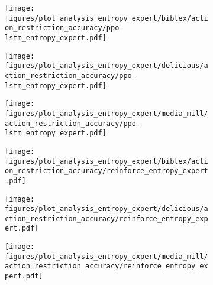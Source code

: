 \begin{figure}[H]
    \begin{subfigure}[b]{0.32\columnwidth}
        \centering
        \texttt{[image: figures/plot\_analysis\_entropy\_expert/bibtex/action\_restriction\_accuracy/ppo-lstm\_entropy\_expert.pdf]}
    \end{subfigure}
    \hfill
    \begin{subfigure}[b]{0.32\columnwidth}
        \centering
        \texttt{[image: figures/plot\_analysis\_entropy\_expert/delicious/action\_restriction\_accuracy/ppo-lstm\_entropy\_expert.pdf]}
    \end{subfigure}
    \hfill
    \begin{subfigure}[b]{0.32\columnwidth}
        \centering
        \texttt{[image: figures/plot\_analysis\_entropy\_expert/media\_mill/action\_restriction\_accuracy/ppo-lstm\_entropy\_expert.pdf]}
    \end{subfigure}
    \hfill

    \begin{subfigure}[b]{0.32\columnwidth}
        \centering
        \texttt{[image: figures/plot\_analysis\_entropy\_expert/bibtex/action\_restriction\_accuracy/reinforce\_entropy\_expert.pdf]}
    \end{subfigure}
    \hfill
    \begin{subfigure}[b]{0.32\columnwidth}
        \centering
        \texttt{[image: figures/plot\_analysis\_entropy\_expert/delicious/action\_restriction\_accuracy/reinforce\_entropy\_expert.pdf]}
    \end{subfigure}
    \hfill
    \begin{subfigure}[b]{0.32\columnwidth}
        \centering
        \texttt{[image: figures/plot\_analysis\_entropy\_expert/media\_mill/action\_restriction\_accuracy/reinforce\_entropy\_expert.pdf]}
    \end{subfigure}
    \hfill


\end{figure}
